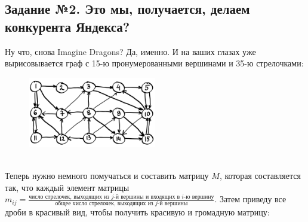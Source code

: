\documentclass[a3paper,14pt]{extarticle}
\begin{document}
\subsection*{\centering Задание №2. Это мы, получается, делаем конкурента Яндекса?}
Ну что, снова Imagine Dragons? Да, именно. И на ваших глазах уже вырисовывается граф с 15-ю пронумерованными вершинами и 35-ю стрелочками:
\begin{figure}[h]
    \centering\includegraphics[width=0.5\textwidth]{2.png}
\end{figure}\\
Теперь нужно немного помучаться и составить матрицу $M$, которая составляется так, что каждый элемент матрицы $m_{ij} = \frac{\text{число стрелочек, выходящих из }j\text{-й вершины и входящих в }i\text{-ю вершину}}{\text{общее число стрелочек, выходящих из }j\text{-й вершины}}$. Затем приведу все дроби в красивый вид, чтобы получить красивую и громадную матрицу:
\end{document}
